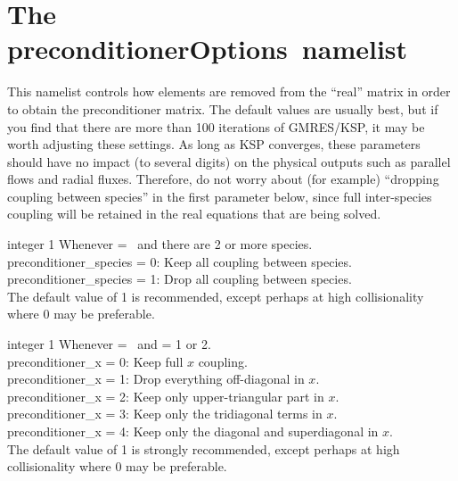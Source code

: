 \section{The {\ttfamily preconditionerOptions}~namelist}

This namelist controls how elements are removed from the ``real'' matrix in order to obtain
the preconditioner matrix. The default values are usually best, but if you find that there are more than 100 iterations
of GMRES/KSP, it may be worth adjusting these settings.  As long as KSP converges, these parameters
should have no impact (to several digits) on the physical outputs such as parallel flows and radial fluxes.
Therefore, do not worry about (for example) ``dropping coupling between species'' in the first
parameter below, since full inter-species coupling will be retained in the real equations that are being solved.

\myhrule

{integer}
{1}
{Whenever  = \true~and there are 2 or more species.}
{\\
{\ttfamily preconditioner\_species} = 0: Keep all coupling between species.\\

{\ttfamily preconditioner\_species} = 1: Drop all coupling between species.\\

The default value of 1 is recommended, except perhaps at high collisionality where 0 may be preferable.}

\myhrule

{integer}
{1}
{Whenever  = \true~and  = 1 or 2.}
{\\
{\ttfamily preconditioner\_x} = 0: Keep full $x$ coupling.\\

{\ttfamily preconditioner\_x} = 1: Drop everything off-diagonal in $x$.\\

{\ttfamily preconditioner\_x} = 2: Keep only upper-triangular part in $x$.\\

{\ttfamily preconditioner\_x} = 3: Keep only the tridiagonal terms in $x$.\\

{\ttfamily preconditioner\_x} = 4: Keep only the diagonal and superdiagonal in $x$.\\

The default value of 1 is strongly recommended, except perhaps at high collisionality where 0 may be preferable.}

